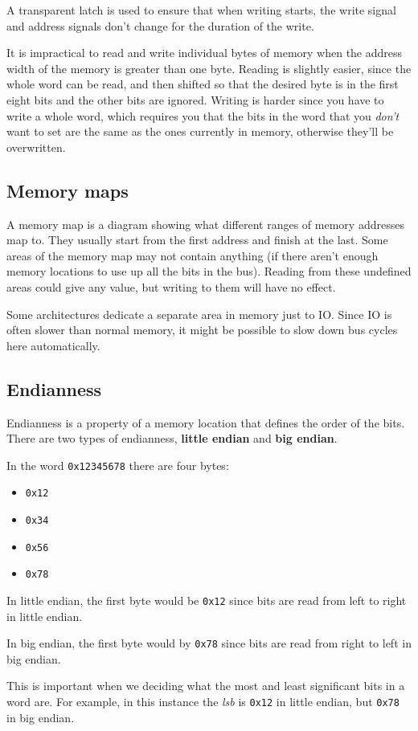A transparent latch is used to ensure that when writing starts, the write signal
and address signals don't change for the duration of the write.

It is impractical to read and write individual bytes of memory when the address
width of the memory is greater than one byte. Reading is slightly easier, since
the whole word can be read, and then shifted so that the desired byte is in the
first eight bits and the other bits are ignored. Writing is harder since you
have to write a whole word, which requires you that the bits in the word that
you {\it don't} want to set are the same as the ones currently in memory,
otherwise they'll be overwritten.

\subsection{Memory maps}

A memory map is a diagram showing what different ranges of memory addresses map
to. They usually start from the first address and finish at the last. Some areas
of the memory map may not contain anything (if there aren't enough memory
locations to use up all the bits in the bus). Reading from these undefined areas
could give any value, but writing to them will have no effect.

Some architectures dedicate a separate area in memory just to IO. Since IO is
often slower than normal memory, it might be possible to slow down bus cycles
here automatically.

\subsection{Endianness}

Endianness is a property of a memory location that defines the order of the bits. There are two types of endianness, {\bf little endian} and {\bf big endian}.

In the word {\tt 0x12345678} there are four bytes:
\begin{itemize}
	\item {\tt 0x12}
	\item {\tt 0x34}
	\item {\tt 0x56}
	\item {\tt 0x78}
\end{itemize}

In little endian, the first byte would be {\tt 0x12} since bits are read from
left to right in little endian.

In big endian, the first byte would by {\tt 0x78} since bits are read from right
to left in big endian.

This is important when we deciding what the most and least significant bits in a
word are. For example, in this instance the {\it lsb} is {\tt 0x12} in little
endian, but {\tt 0x78} in big endian.